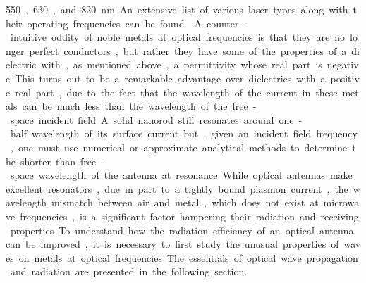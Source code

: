 \SI{550}, \SI{630}, and \SI{820}{\nm}. An extensive list of various laser types along with their operating frequencies can be found \cite{Weber2000}.
%

A counter-intuitive oddity of noble metals at optical frequencies is that they are no longer perfect conductors, but rather they have some of the properties of a dielectric with, as mentioned above, a permittivity whose real part is negative. This turns out to be a remarkable advantage over dielectrics with a positive real part, due to the fact that the wavelength of the current in these metals can be much less than the wavelength of the free-space incident field. A solid nanorod still resonates around one-half wavelength of its surface current but, given an incident field frequency, one must use numerical or approximate analytical methods to determine the shorter than free-space wavelength of the antenna at resonance. While optical antennas make excellent resonators, due in part to a tightly bound plasmon current, the wavelength mismatch between air and metal, which does not exist at microwave frequencies, is a significant factor hampering their radiation and receiving properties. To understand how the radiation efficiency of an optical antenna can be improved, it is necessary to first study the unusual properties of waves on metals at optical frequencies. The essentials of optical wave propagation and radiation are presented in the following section.

